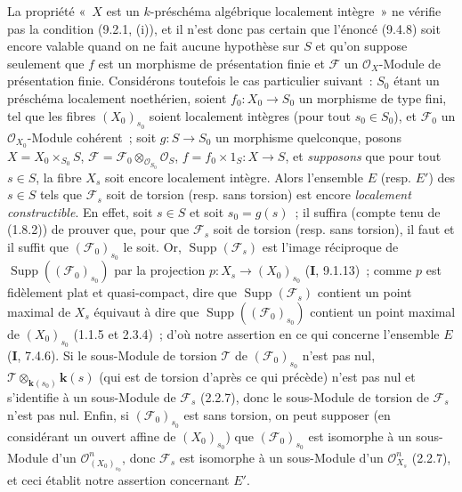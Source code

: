 \begin{remark}[9.4.9]
\label{IV.9.4.9-fr}
La propriété «~$X$ est un $k$-préschéma algébrique localement intègre~» ne
vérifie pas la condition (9.2.1, (i)), et il n'est donc pas certain que
l'énoncé (9.4.8) soit encore valable quand on ne fait aucune hypothèse sur $S$
et qu'on suppose seulement que $f$ est un morphisme de présentation finie et
$\mathcal F$ un $\mathcal O_X$-Module de présentation finie. Considérons
toutefois le cas particulier suivant~: $S_0$ étant un préschéma localement
noethérien, soient $f_0:X_0\to S_0$ un morphisme de type fini, tel que les
fibres $(X_0)_{s_0}$ soient localement intègres (pour tout $s_0\in S_0$), et
$\mathcal F_0$ un $\mathcal O_{X_0}$-Module cohérent~; soit $g:S\to S_0$ un
morphisme quelconque, posons
$X=X_0\times_{S_0}S$, $\mathcal F=\mathcal F_0\otimes_{\mathcal O_{S_0}}
\mathcal O_S$, $f=f_0\times1_S:X\to S$, et \emph{supposons} que pour tout
$s\in S$, la fibre $X_s$ soit encore localement intègre. Alors l'ensemble $E$
(resp. $E'$) des $s\in S$ tels que $\mathcal F_s$ soit de torsion (resp. sans
torsion) est encore \emph{localement constructible}. En effet, soit $s\in S$
et soit $s_0=g(s)$~; il suffira (compte tenu de (1.8.2)) de prouver que, pour
que $\mathcal F_s$ soit de torsion (resp. sans torsion), il faut et il suffit
que $(\mathcal F_0)_{s_0}$ le soit. Or,
$\operatorname{Supp}(\mathcal F_s)$ est l'image réciproque de
$\operatorname{Supp}((\mathcal F_0)_{s_0})$ par la projection
$p:X_s\to(X_0)_{s_0}$ (\textbf{I}, 9.1.13)~; comme $p$ est fidèlement plat et
quasi-compact, dire que $\operatorname{Supp}(\mathcal F_s)$ contient un point
maximal de $X_s$ équivaut à dire que
$\operatorname{Supp}((\mathcal F_0)_{s_0})$ contient un point maximal de
$(X_0)_{s_0}$ (1.1.5 et 2.3.4)~; d'où notre assertion en ce qui concerne
l'ensemble $E$ (\textbf{I}, 7.4.6). Si le sous-Module de torsion $\mathcal T$
de $(\mathcal F_0)_{s_0}$ n'est pas nul,
$\mathcal T\otimes_{\mathbf{k}(s_0)}\boldsymbol{k}(s)$ (qui est de torsion d'après ce qui précède)
n'est pas nul et s'identifie à un sous-Module de $\mathcal F_s$ (2.2.7), donc
le sous-Module de torsion de $\mathcal F_s$ n'est pas nul. Enfin, si
$(\mathcal F_0)_{s_0}$ est sans torsion, on peut supposer (en considérant un
ouvert affine de $(X_0)_{s_0}$) que $(\mathcal F_0)_{s_0}$ est isomorphe à un
sous-Module d'un $\mathcal O_{(X_0)_{s_0}}^n$, donc $\mathcal F_s$ est
isomorphe à un sous-Module d'un $\mathcal O_{X_s}^n$ (2.2.7), et ceci établit
notre assertion concernant $E'$.
\end{remark}

